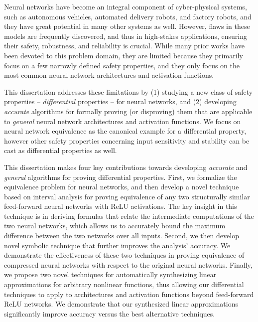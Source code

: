 Neural networks have become an integral component of cyber-physical systems, such
as autonomous vehicles, automated delivery robots, and factory robots, and they
have great potential in many other systems as well.
%
However, flaws in these models are frequently discovered, and thus in high-stakes
applications, ensuring their safety, robustness, and reliability is crucial.
%
While many prior works have been devoted to this problem domain, they are limited
because they primarily focus on a few narrowly defined safety properties, and
they only focus on the most common neural network architectures and activation
functions.

This dissertation addresses these limitations by (1) studying a new class of
safety properties -- \textit{differential} properties -- for neural networks,
%
and (2)  developing \textit{accurate} algorithms for formally proving (or
disproving) them that are applicable to \textit{general} neural network
architectures and
activation functions.
%
We focus on neural network equivalence as the canonical example for a
differential property, however other safety properties concerning input
sensitivity and stability can be cast as differential properties as well.

This dissertation makes four key contributions towards developing
\textit{accurate} and \textit{general} algorithms for proving differential
properties.
%
First, we formalize the equivalence problem for neural networks, and then develop
a novel technique based on interval analysis for proving equivalence of any two
structurally similar feed-forward neural networks with ReLU activations.
%
The key insight in
this technique is in deriving formulas that relate the intermediate computations
of the two neural networks, which allows us to accurately bound the maximum
difference between the two networks over all inputs.
%
Second, we then develop novel symbolic technique that further improves the
analysis' accuracy.
%
We demonstrate the effectiveness of these two techniques in
proving equivalence of compressed neural networks with respect to the original
neural networks.
%
Finally, we propose two novel techniques for automatically synthesizing
linear approximations for arbitrary nonlinear functions, thus allowing our
differential techniques to apply to architectures and activation functions beyond
feed-forward ReLU networks.
%
We demonstrate that our synthesized linear approximations significantly improve
accuracy versus the best alternative techniques.